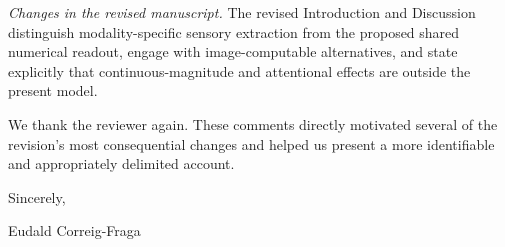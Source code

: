\documentclass[11pt]{article}
\newcommand{\change}[1]{\par\noindent\textit{Changes in the revised manuscript.} #1\par}
\begin{document}
\change{The revised Introduction and Discussion distinguish modality-specific sensory extraction from the proposed shared numerical readout, engage with image-computable alternatives, and state explicitly that continuous-magnitude and attentional effects are outside the present model.}

We thank the reviewer again. These comments directly motivated several of the revision's most consequential changes and helped us present a more identifiable and appropriately delimited account.

Sincerely,

Eudald Correig-Fraga
\end{document}
